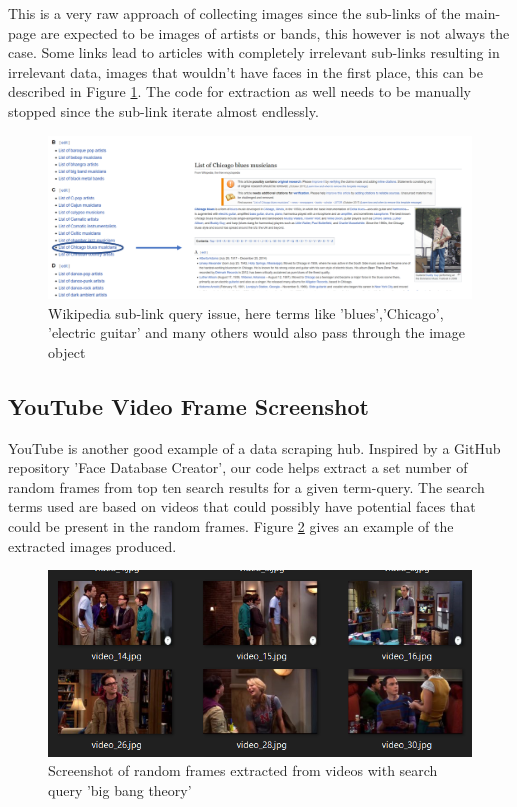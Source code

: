 \documentclass[preprint,12pt]{elsarticle}
\begin{document}
This is a very raw approach of collecting images since the sub-links of the main-page are expected to be images of artists or bands, this however is not always the case. Some links lead to articles with completely irrelevant sub-links resulting in irrelevant data, images that wouldn't have faces in the first place, this can be described in Figure \ref{fig:WikiExtractIssue}. The code for extraction as well needs to be manually stopped since the sub-link iterate almost endlessly. 

\begin{figure}[ht]
\centering\includegraphics[width=0.7\linewidth]{wikiextract_issue.png}
\caption{Wikipedia sub-link query issue, here terms like 'blues','Chicago', 'electric guitar' and many others would also pass through the image object}
\label{fig:WikiExtractIssue}
\end{figure}

\subsection{YouTube Video Frame Screenshot}
YouTube is another good example of a data scraping hub. Inspired by a GitHub repository 'Face Database Creator'\cite{frc}, our code helps extract a set number of random frames from top ten search results for a given term-query. The search terms used are based on videos that could possibly have potential faces that could be present in the random frames. Figure \ref{fig:Youtube} gives an example of the extracted images produced.

\begin{figure}[ht]
\centering\includegraphics[width=0.7\linewidth]{yt.png}
\caption{Screenshot of random frames extracted from videos with search query 'big bang theory'}
\label{fig:Youtube}
\end{figure}
\end{document}
